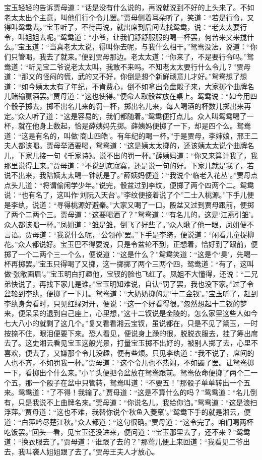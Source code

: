 \begin{parag}
    宝玉轻轻的告诉贾母道：“话是没有什么说的，再说就说到不好的上头来了。不如老太太出个主意，叫他们行个令儿罢。”贾母侧着耳朵听了，笑道：“若是行令，又得叫鸳鸯去。”宝玉听了，不待再说，就出席到后间去找鸳鸯，说：“老太太要行令，叫姐姐去呢。”鸳鸯道：“小爷，让我们舒舒服服的喝一杯罢，何苦来又来搅什么。”宝玉道：“当真老太太说，得叫你去呢，与我什么相干。”鸳鸯没法，说道：“你们只管喝，我去了就来。”便到贾母那边。老太太道：“你来了，不是要行令吗。”鸳鸯道：“听见宝二爷说老太太叫，我敢不来吗。不知老太太要行什么令儿？”贾母道：“那文的怪闷的慌，武的又不好，你倒是想个新鲜顽意儿才好。”鸳鸯想了想道：“如今姨太太有了年纪，不肯费心，倒不如拿出令盘骰子来，大家掷个曲牌名儿赌输赢酒罢。”贾母道：“这也使得。”便命人取骰盆放在桌上。鸳鸯说：“如今用四个骰子掷去，掷不出名儿来的罚一杯，掷出名儿来，每人喝酒的杯数儿掷出来再定。”众人听了道：“这是容易的，我们都随着。”鸳鸯便打点儿。众人叫鸳鸯喝了一杯，就在他身上数起，恰是薛姨妈先掷。薛姨妈便掷了一下，却是四个么。鸳鸯道：“这是有名的，叫做‘商山四皓’。有年纪的喝一杯。”于是贾母，李婶娘，邢王二夫人都该喝。贾母举酒要喝，鸳鸯道：“这是姨太太掷的，还该姨太太说个曲牌名儿，下家儿接一句《千家诗》。说不出的罚一杯。”薛姨妈道：“你又来算计我了，我那里说得上来。”贾母道：“不说到底寂寞，还是说一句的好。下家儿就是我了，若说不出来，我陪姨太太喝一钟就是了。”薛姨妈便道：“我说个‘临老入花丛’。”贾母点点头儿道：“将谓偷闲学少年。”说完，骰盆过到李纹，便掷了两个四两个二。鸳鸯说：“也有名了，这叫作‘刘阮入天台’。”李纹便接着说了个”二士入桃源。”下手儿便是李纨，说道：“寻得桃源好避秦。”大家又喝了一口。骰盆又过到贾母跟前，便掷了两个二两个三。贾母道：“这要喝酒了？”鸳鸯道：“有名儿的，这是‘江燕引雏’。众人都该喝一杯。”凤姐道：“雏是雏，倒飞了好些了。”众人瞅了他一眼，凤姐便不言语。贾母道：“我说什么呢，‘公领孙’罢。”下手是李绮，便说道：“闲看儿童捉柳花。”众人都说好。宝玉巴不得要说，只是令盆轮不到，正想着，恰好到了跟前，便掷了一个二两个三一个么，便说道：“这是什么？”鸳鸯笑道：“这是个‘臭’，先喝一杯再掷罢。”宝玉只得喝了又掷，这一掷掷了两个三两个四，鸳鸯道：“有了，这叫做‘张敞画眉’。”宝玉明白打趣他，宝钗的脸也飞红了。凤姐不大懂得，还说：“二兄弟快说了，再找下家儿是谁。”宝玉明知难说，自认“罚了罢，我也没下家。”过了令盆轮到李纨，便掷了一下儿。鸳鸯道：“大奶奶掷的是‘十二金钗’。”宝玉听了，赶到李纨身旁看时，只见红绿对开，便说：“这一个好看得很。”忽然想起十二钗的梦来，便呆呆的退到自己座上，心里想，”这十二钗说是金陵的，怎么家里这些人如今七大八小的就剩了这几个。”复又看看湘云宝钗，虽说都在，只是不见了黛玉，一时按捺不住，眼泪便要下来。恐人看见，便说身上躁的很，脱脱衣服去，挂了筹出席去了。这史湘云看见宝玉这般光景，打量宝玉掷不出好的，被别人掷了去，心里不喜欢，便去了，又嫌那个令儿没趣，便有些烦。只见李纨道：“我不说了，席间的人也不齐，不如罚我一杯。”贾母道：“这个令儿也不热闹，不如蠲了罢。让鸳鸯掷一下，看掷出个什么来。”小丫头便把令盆放在鸳鸯跟前。鸳鸯依命便掷了两个二一个五，那一个骰子在盆中只管转，鸳鸯叫道：“不要五！”那骰子单单转出一个五来。鸳鸯道：“了不得！我输了。”贾母道：“这是不算什么的吗？”鸳鸯道：“名儿倒有，只是我说不上曲牌名来。”贾母道：“你说名儿，我给你诌。”鸳鸯道：“这是浪扫浮萍。”贾母道：“这也不难，我替你说个‘秋鱼入菱窠’。”鸳鸯下手的就是湘云，便道：“白萍吟尽楚江秋。”众人都道：“这句很确。”贾母道：“这令完了。咱们喝两杯吃饭罢。”回头一看，见宝玉还没进来，便问道：“宝玉那里去了，还不来？”鸳鸯道：“换衣服去了。”贾母道：“谁跟了去的？”那莺儿便上来回道：“我看见二爷出去，我叫袭人姐姐跟了去了。”贾母王夫人才放心。

\end{parag}
